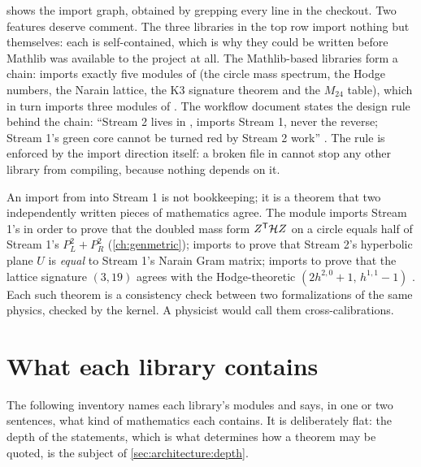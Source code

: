  shows the import graph, obtained by grepping every
 line in the checkout. Two features deserve comment. The three libraries in the
top row import nothing but themselves: each is self-contained, which is why they could be
written before Mathlib was available to the project at all. The Mathlib-based libraries form
a chain:  imports exactly five modules of
 (the circle mass spectrum, the Hodge numbers, the Narain
lattice, the K3 signature theorem and the $M_{24}$ table), which in turn imports three
modules of . The workflow document states the
design rule behind the chain: ``Stream 2 lives in , imports Stream 1,
never the reverse; Stream 1's green core cannot be turned red by Stream 2 work''
. The rule is enforced by the import direction
itself: a broken file in  cannot stop any other library from
compiling, because nothing depends on it.

\begin{physicsbox}
An import from  into Stream 1 is not bookkeeping; it is a theorem
that two independently written pieces of mathematics agree. The module
 imports Stream 1's  in order to
prove that the doubled mass form $Z^{\mathsf T}\mathcal{H} Z$ on a circle equals half of Stream 1's
$P_L^2+P_R^2$ (\cref{ch:genmetric});  imports
 to prove that Stream 2's hyperbolic plane $U$ is \emph{equal} to Stream
1's Narain Gram matrix;  imports 
to prove that the lattice signature $(3,19)$ agrees with the Hodge-theoretic
$(2h^{2,0}+1,\,h^{1,1}-1)$ . Each such
theorem is a consistency check between two formalizations of the same physics, checked by
the kernel. A physicist would call them cross-calibrations.
\end{physicsbox}

\section{What each library contains}\label{sec:architecture:contents}

The following inventory names each library's modules and says, in one or two sentences,
what kind of mathematics each contains. It is deliberately flat: the depth of the
statements, which is what determines how a theorem may be quoted, is the subject of
\cref{sec:architecture:depth}.

